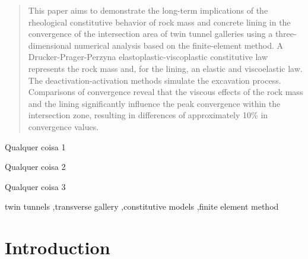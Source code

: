 \documentclass[a4paper,fleqn]{cas-sc}
\begin{document}
\begin{abstract}
This paper aims to demonstrate the long-term implications of the rheological constitutive behavior of rock mass and concrete lining in the convergence of the intersection area of twin tunnel galleries using a three-dimensional numerical analysis based on the finite-element method. A Drucker-Prager-Perzyna elastoplastic-viscoplastic constitutive law represents the rock mass and, for the lining, an elastic and viscoelastic law. The deactivation-activation methods simulate the excavation process. Comparisons of convergence reveal that the viscous effects of the rock mass and the lining significantly influence the peak convergence within the intersection zone, resulting in differences of approximately 10\% in convergence values.
\end{abstract}


\begin{highlights}
	\item Qualquer coisa 1
	\item Qualquer coisa 2
	\item Qualquer coisa 3 
\end{highlights}

\begin{keywords}
twin tunnels \sep transverse gallery \sep constitutive models \sep finite element method
\end{keywords}

\maketitle

\section{Introduction}\label{}
\end{document}
